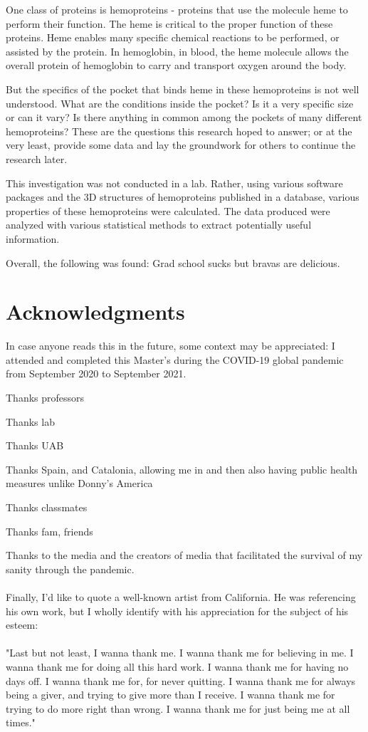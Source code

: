 \documentclass[12pt,oneside,a4paper]{report}
\begin{document}
		One class of proteins is hemoproteins - proteins that use the molecule heme to perform their function. The heme is critical to the proper function of these proteins. Heme enables many specific chemical reactions to be performed, or assisted by the protein. In hemoglobin, in blood, the heme molecule allows the overall protein of hemoglobin to carry and transport oxygen around the body.
		
		But the specifics of the pocket that binds heme in these hemoproteins is not well understood. What are the conditions inside the pocket? Is it a very specific size or can it vary? Is there anything in common among the pockets of many different hemoproteins? These are the questions this research hoped to answer; or at the very least, provide some data and lay the groundwork for others to continue the research later.
		
		This investigation was not conducted in a lab. Rather, using various software packages and the 3D structures of hemoproteins published in a database, various properties of these hemoproteins were calculated. The data produced were analyzed with various statistical methods to extract potentially useful information.
		
		Overall, the following was found:
		Grad school sucks but bravas are delicious.
	
	\chapter*{Acknowledgments}
	
		In case anyone reads this in the future, some context may be appreciated: I attended and completed this Master's during the COVID-19 global pandemic from September 2020 to September 2021.
		
		Thanks professors
		
		Thanks lab
		
		Thanks UAB
		
		Thanks Spain, and Catalonia, allowing me in and then also having public health measures unlike Donny's America
		
		Thanks classmates
		
		Thanks fam, friends
		
		Thanks to the media and the creators of media that facilitated the survival of my sanity through the pandemic.
		\\~\\
		Finally, I'd like to quote a well-known artist from California. He was referencing his own work, but I wholly identify with his appreciation for the subject of his esteem:
		\\~\\
		"Last but not least, I wanna thank me. I wanna thank me for believing in me. I wanna thank me for doing all this hard work. I wanna thank me for having no days off. I wanna thank me for, for never quitting. I wanna thank me for always being a giver, and trying to give more than I receive. I wanna thank me for trying to do more right than wrong. I wanna thank me for just being me at all times."
		
\end{document}
